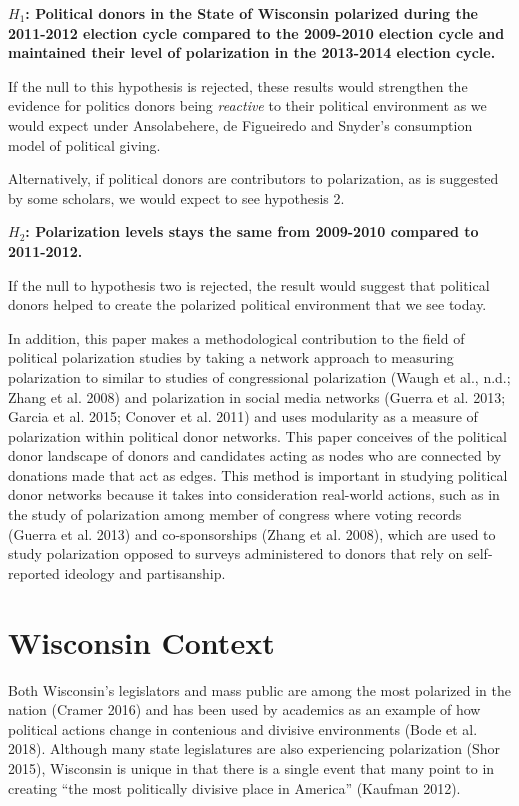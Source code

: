 \documentclass[12pt,]{article}
\begin{document}
\textbf{\(H_{1}\): Political donors in the State of Wisconsin polarized
during the 2011-2012 election cycle compared to the 2009-2010 election
cycle and maintained their level of polarization in the 2013-2014
election cycle.}

If the null to this hypothesis is rejected, these results would
strengthen the evidence for politics donors being \emph{reactive} to
their political environment as we would expect under Ansolabehere, de
Figueiredo and Snyder's consumption model of political giving.

Alternatively, if political donors are contributors to polarization, as
is suggested by some scholars, we would expect to see hypothesis 2.

\textbf{\(H_{2}\): Polarization levels stays the same from 2009-2010
compared to 2011-2012.}

If the null to hypothesis two is rejected, the result would suggest that
political donors helped to create the polarized political environment
that we see today.

In addition, this paper makes a methodological contribution to the field
of political polarization studies by taking a network approach to
measuring polarization to similar to studies of congressional
polarization (Waugh et al., n.d.; Zhang et al. 2008) and polarization in
social media networks (Guerra et al. 2013; Garcia et al. 2015; Conover
et al. 2011) and uses modularity as a measure of polarization within
political donor networks. This paper conceives of the political donor
landscape of donors and candidates acting as nodes who are connected by
donations made that act as edges. This method is important in studying
political donor networks because it takes into consideration real-world
actions, such as in the study of polarization among member of congress
where voting records (Guerra et al. 2013) and co-sponsorships (Zhang et
al. 2008), which are used to study polarization opposed to surveys
administered to donors that rely on self-reported ideology and
partisanship.

\hypertarget{wisconsin-context}{%
\section{Wisconsin Context}\label{wisconsin-context}}

Both Wisconsin's legislators and mass public are among the most
polarized in the nation (Cramer 2016) and has been used by academics as
an example of how political actions change in contenious and divisive
environments (Bode et al. 2018). Although many state legislatures are
also experiencing polarization (Shor 2015), Wisconsin is unique in that
there is a single event that many point to in creating ``the most
politically divisive place in America'' (Kaufman 2012).
\end{document}
